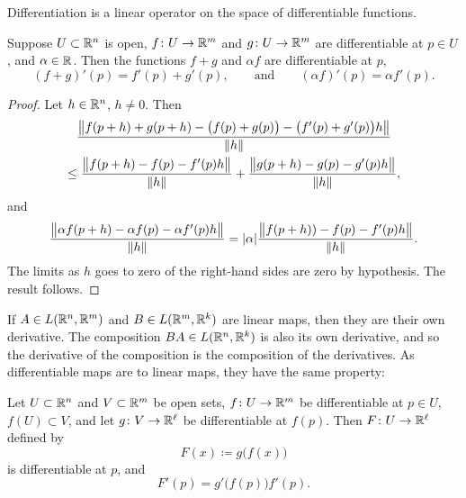 Differentiation is a linear operator on the space of differentiable
functions.

\begin{prop}
Suppose $U \subset {\mathbb{R}}^n$ is open,
$f \colon U \to {\mathbb{R}}^m$ and
$g \colon U \to {\mathbb{R}}^m$ are differentiable at $p \in U$,
and $\alpha \in {\mathbb{R}}$.  Then the functions $f+g$ and $\alpha f$
are differentiable at $p$,
\begin{equation*}
(f+g)'(p) = f'(p) + g'(p) , \qquad \text{and} \qquad (\alpha f)'(p) = \alpha
f'(p) .
\end{equation*}
\end{prop}

\begin{proof}
Let $h \in {\mathbb{R}}^n$, $h \neq 0$.  Then
\begin{multline*}
\frac{\bigl\lVert {f(p+h)+g(p+h)-\bigl(f(p)+g(p)\bigr) - \bigl(f'(p) + g'(p)\bigr)h} \bigr\rVert}{\lVert {h} \rVert}
\\
\leq
\frac{\bigl\lVert {f(p+h)-f(p) - f'(p)h} \bigr\rVert}{\lVert {h} \rVert}
+
\frac{\bigl\lVert {g(p+h)-g(p) - g'(p)h} \bigr\rVert}{\lVert {h} \rVert} ,
\end{multline*}
and
\begin{equation*}
\frac{\bigl\lVert {\alpha f(p+h) - \alpha f(p) - \alpha f'(p)h} \bigr\rVert}{\lVert {h} \rVert}
=
\lvert {\alpha} \rvert \frac{\bigl\lVert {f(p+h))-f(p) - f'(p)h} \bigr\rVert}{\lVert {h} \rVert} .
\end{equation*}
The limits as $h$ goes to zero of the right-hand sides are zero by
hypothesis.  The result follows.
\end{proof}

If $A \in L({\mathbb{R}}^n,{\mathbb{R}}^m)$ and $B \in L({\mathbb{R}}^m,{\mathbb{R}}^k)$ are linear maps, then 
they are their own derivative.  The composition
$BA \in L({\mathbb{R}}^n,{\mathbb{R}}^k)$ is also its own derivative, and
so the derivative of the composition is the composition
of the derivatives.  As differentiable maps are
to linear maps, they have the same property:

\begin{thm} 
Let $U \subset {\mathbb{R}}^n$ and $V \subset {\mathbb{R}}^m$ be open sets, $f \colon U \to
{\mathbb{R}}^m$ be differentiable at $p \in U$, $f(U) \subset V$,
and let $g \colon V \to {\mathbb{R}}^\ell$ be differentiable
at $f(p)$.  Then $F \colon U \to {\mathbb{R}}^{\ell}$ defined by
\begin{equation*}
F(x) \coloneqq g\bigl(f(x)\bigr)
\end{equation*}
is differentiable at $p$, and
\begin{equation*}
F'(p) = g'\bigl(f(p)\bigr) f'(p) .
\end{equation*}
\end{thm}

